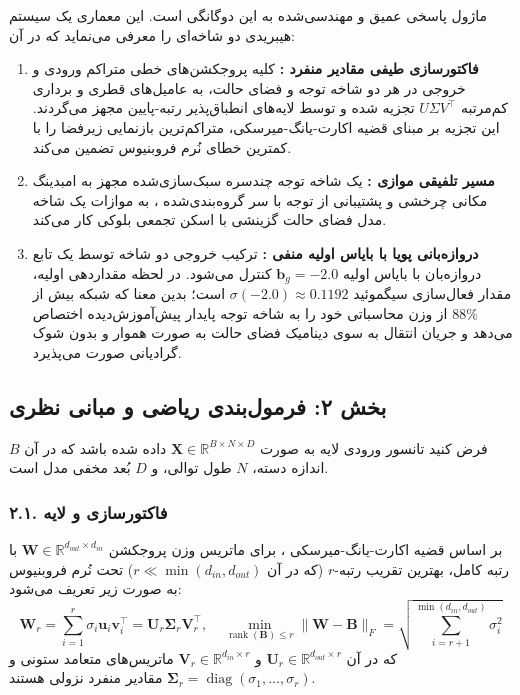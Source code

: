 ماژول  پاسخی عمیق و مهندسی‌شده به این دوگانگی است. این معماری یک سیستم هیبریدی دو شاخه‌ای  را معرفی می‌نماید که در آن:
\begin{enumerate}
    \item \textbf{فاکتورسازی طیفی مقادیر منفرد :} کلیه پروجکشن‌های خطی متراکم ورودی و خروجی در هر دو شاخه توجه و فضای حالت، به عامیل‌های قطری و برداری کم‌مرتبه $U \Sigma V^\top$ تجزیه شده و توسط لایه‌های انطباق‌پذیر رتبه-پایین  مجهز می‌گردند. این تجزیه بر مبنای قضیه اکارت-یانگ-میرسکی، متراکم‌ترین بازنمایی زیرفضا را با کمترین خطای نُرم فروبنیوس تضمین می‌کند.
    \item \textbf{مسیر تلفیقی موازی :} یک شاخه توجه چندسره سبک‌سازی‌شده مجهز به امبدینگ مکانی چرخشی  و پشتیبانی از توجه با سر گروه‌بندی‌شده ، به موازات یک شاخه مدل فضای حالت گزینشی  با اسکن تجمعی بلوکی کار می‌کند.
    \item \textbf{دروازه‌بانی پویا با بایاس اولیه منفی :} ترکیب خروجی دو شاخه توسط یک تابع دروازه‌بان با بایاس اولیه $\mathbf{b}_g = -2.0$ کنترل می‌شود. در لحظه مقداردهی اولیه، مقدار فعال‌سازی سیگموئید $\sigma(-2.0) \approx 0.1192$ است؛ بدین معنا که شبکه بیش از $88\%$ از وزن محاسباتی خود را به شاخه توجه پایدار پیش‌آموزش‌دیده اختصاص می‌دهد و جریان انتقال به سوی دینامیک فضای حالت به صورت هموار و بدون شوک گرادیانی صورت می‌پذیرد.
\end{enumerate}

\subsection*{بخش ۲: فرمول‌بندی ریاضی و مبانی نظری }
فرض کنید تانسور ورودی لایه به صورت $\mathbf{X} \in \mathbb{R}^{B \times N \times D}$ داده شده باشد که در آن $B$ اندازه دسته، $N$ طول توالی، و $D$ بُعد مخفی مدل  است.

\subsubsection*{۲.۱. فاکتورسازی  و لایه }
بر اساس قضیه اکارت-یانگ-میرسکی ، برای ماتریس وزن پروجکشن $\mathbf{W} \in \mathbb{R}^{d_{out} \times d_{in}}$ با رتبه کامل، بهترین تقریب رتبه-$r$ (که در آن $r \ll \min(d_{in}, d_{out})$) تحت نُرم فروبنیوس به صورت زیر تعریف می‌شود:
\begin{equation}
\mathbf{W}_r = \sum_{i=1}^r \sigma_i \mathbf{u}_i \mathbf{v}_i^\top = \mathbf{U}_r \mathbf{\Sigma}_r \mathbf{V}_r^\top, \quad \min_{\operatorname{rank}(\mathbf{B}) \le r} \|\mathbf{W} - \mathbf{B}\|_F = \sqrt{\sum_{i=r+1}^{\min(d_{in}, d_{out})} \sigma_i^2}
\end{equation}
که در آن $\mathbf{U}_r \in \mathbb{R}^{d_{out} \times r}$ و $\mathbf{V}_r \in \mathbb{R}^{d_{in} \times r}$ ماتریس‌های متعامد ستونی و $\mathbf{\Sigma}_r = \operatorname{diag}(\sigma_1, \dots, \sigma_r)$ مقادیر منفرد نزولی هستند.

